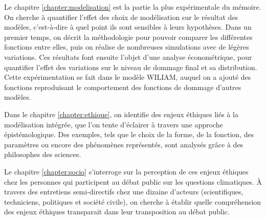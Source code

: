 Le chapitre \ref{chapter:modelisation} est la partie la plus expérimentale du mémoire. On cherche à quantifier l'effet des choix de modélisation sur le résultat des modèles, c'est-à-dire à quel point ils sont sensibles à leurs hypothèses. Dans un premier temps, on décrit la méthodologie pour pouvoir comparer les différentes fonctions entre elles, puis on réalise de nombreuses simulations avec de légères variations. Ces résultats font ensuite l'objet d'une analyse économétrique, pour quantifier l'effet des variations sur le niveau de dommage final et sa distribution. Cette expérimentation se fait dans le modèle \Gls{WILIAM}, auquel on a ajouté des fonctions reproduisant le comportement des fonctions de dommage d'autres modèles.

Dans le chapitre \ref{chapter:ethique}, on identifie des enjeux éthiques liés à la modélisation intégrée, que l'on tente d'éclairer à travers une approche épistémologique. Des exemples, tels que le choix de la forme, de la fonction, des paramètres ou encore des phénomènes représentés, sont analysés grâce à des philosophes des sciences.


Le chapitre \ref{chapter:socio} s'interroge sur la perception de ces enjeux éthiques chez les personnes qui participent au débat public sur les questions climatiques. À travers des entretiens semi-directifs chez une dizaine d'acteurs (scientifiques, techniciens, politiques et société civile), on cherche à établir quelle compréhension des enjeux éthiques transparait dans leur transposition au débat public. 

